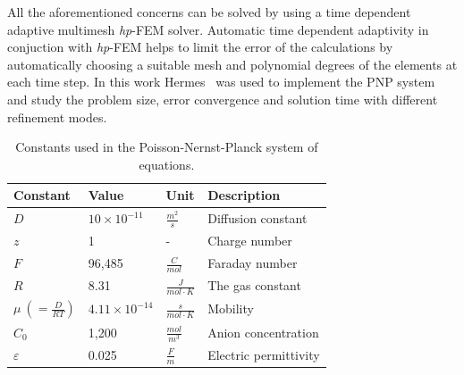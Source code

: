 All the aforementioned concerns can be solved by using
a time dependent adaptive multimesh \emph{hp}-FEM solver.
Automatic time dependent adaptivity in conjuction with \emph{hp}-FEM 
helps to limit the error of the calculations by automatically choosing
a suitable mesh and polynomial degrees of the elements at each time step.
In this work Hermes~\cite{Hermes-project} was used to implement
the PNP system and study
the problem size, error convergence and solution time 
with different refinement modes.

\begin{table}
\caption{Constants used in the Poisson-Nernst-Planck system of equations.}
\centering
\label{Table:used-constants}
{
\begin{tabular}{llll}
  \hline \hline
  Constant&Value&Unit&Description\\
  \hline
  $D$&$10\times10^{-11}$&$\frac{m^2}{s}$&Diffusion constant\\
  $z$&1&-&Charge number\\
  $F$&96,485&$\frac{C}{mol}$&Faraday number\\
  $R$&8.31&$\frac{J}{mol\cdot K}$&The gas constant\\
  $\mu\ \left( = \frac{D}{RT}\right)$&$4.11\times 10^{-14}$&$\frac{s}{mol\cdot K}$&Mobility\\
  $C_{0}$&1,200&$\frac{mol}{m^3}$&Anion concentration\\
  $\varepsilon$&0.025&$\frac{F}{m}$&Electric permittivity\\
  \hline
  \hline
\end{tabular}
}
\end{table}


